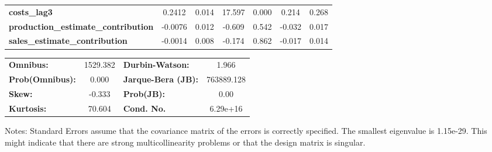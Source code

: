 \begin{center}
\begin{tabular}{lcccccc}
\textbf{costs\_lag3}                        &       0.2412  &        0.014     &    17.597  &         0.000        &        0.214    &        0.268     \\
\textbf{production\_estimate\_contribution} &      -0.0076  &        0.012     &    -0.609  &         0.542        &       -0.032    &        0.017     \\
\textbf{sales\_estimate\_contribution}      &      -0.0014  &        0.008     &    -0.174  &         0.862        &       -0.017    &        0.014     \\
\bottomrule
\end{tabular}
\begin{tabular}{lclc}
\textbf{Omnibus:}       & 1529.382 & \textbf{  Durbin-Watson:     } &     1.966   \\
\textbf{Prob(Omnibus):} &   0.000  & \textbf{  Jarque-Bera (JB):  } & 763889.128  \\
\textbf{Skew:}          &  -0.333  & \textbf{  Prob(JB):          } &      0.00   \\
\textbf{Kurtosis:}      &  70.604  & \textbf{  Cond. No.          } &  6.29e+16   \\
\bottomrule
\end{tabular}
\end{center}

Notes: \newline
 [1] Standard Errors assume that the covariance matrix of the errors is correctly specified. \newline
 [2] The smallest eigenvalue is 1.15e-29. This might indicate that there are \newline
 strong multicollinearity problems or that the design matrix is singular.